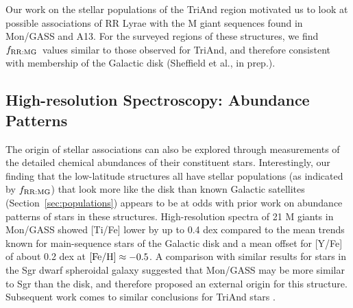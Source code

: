 \documentclass[galaxies,article,submit,moreauthors,pdftex,10pt,a4paper]{mdpi}
\newcommand{\frrmg}{\ensuremath{f_{\rm RR:MG}}}
\begin{document}
Our work on the stellar populations of the TriAnd region motivated us to look at possible associations of RR Lyrae with the M giant sequences found in Mon/GASS and A13.
For the surveyed regions of these structures, we find \frrmg\ values similar to those observed for TriAnd, and therefore consistent with membership of the Galactic disk (Sheffield et al., in prep.).


\subsection{High-resolution Spectroscopy: Abundance Patterns}

\label{sec:abundances}

The origin of stellar associations can also be explored through measurements of
the detailed chemical abundances of their constituent stars.
Interestingly, our finding that the low-latitude structures all have stellar
populations (as indicated by \frrmg) that look more like the disk than known
Galactic satellites (Section~\ref{sec:populations}) appears to be at odds with
prior work on abundance patterns of stars in these structures.
High-resolution spectra of 21 M giants in Mon/GASS \cite{chou2010b} showed
[Ti/Fe] lower by up to 0.4 dex compared to the mean trends known for
main-sequence stars of the Galactic disk \cite[e.g.,][]{reddy03,bensby2014} and
a mean offset for [Y/Fe] of about 0.2 dex at ${\rm [Fe/H]} \approx -0.5$.
A comparison with similar results for stars in the Sgr dwarf spheroidal galaxy
\cite{chou2010a} suggested that Mon/GASS may be more similar to Sgr than the
disk, and therefore proposed an external origin for this structure. Subsequent
work comes to similar conclusions for TriAnd stars \cite{chou11}.

\end{document}
